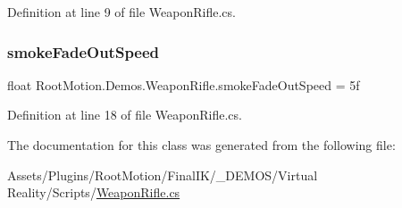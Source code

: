 Definition at line 9 of file Weapon\+Rifle.\+cs.

\mbox{\label{class_root_motion_1_1_demos_1_1_weapon_rifle_a7b8b3da1883717e3ce72c46920168044}} 
\subsubsection{\texorpdfstring{smoke\+Fade\+Out\+Speed}{smokeFadeOutSpeed}}
{\footnotesize\ttfamily float Root\+Motion.\+Demos.\+Weapon\+Rifle.\+smoke\+Fade\+Out\+Speed = 5f}



Definition at line 18 of file Weapon\+Rifle.\+cs.



The documentation for this class was generated from the following file\+:\begin{DoxyCompactItemize}
\item 
Assets/\+Plugins/\+Root\+Motion/\+Final\+I\+K/\+\_\+\+D\+E\+M\+O\+S/\+Virtual Reality/\+Scripts/\mbox{\hyperlink{_weapon_rifle_8cs}{Weapon\+Rifle.\+cs}}\end{DoxyCompactItemize}
